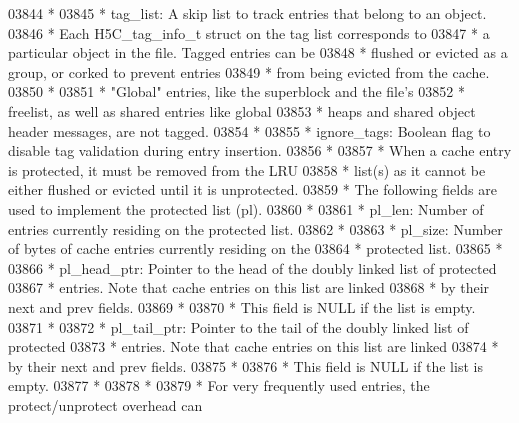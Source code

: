 \begin{DoxyCode}
03844 \textcolor{comment}{ *}
03845 \textcolor{comment}{ * tag\_list: A skip list to track entries that belong to an object.}
03846 \textcolor{comment}{ *                Each H5C\_tag\_info\_t struct on the tag list corresponds to}
03847 \textcolor{comment}{ *                a particular object in the file.  Tagged entries can be}
03848 \textcolor{comment}{ *                flushed or evicted as a group, or corked to prevent entries}
03849 \textcolor{comment}{ *                from being evicted from the cache.}
03850 \textcolor{comment}{ *}
03851 \textcolor{comment}{ *                "Global" entries, like the superblock and the file's}
03852 \textcolor{comment}{ *                freelist, as well as shared entries like global}
03853 \textcolor{comment}{ *                heaps and shared object header messages, are not tagged.}
03854 \textcolor{comment}{ *}
03855 \textcolor{comment}{ * ignore\_tags: Boolean flag to disable tag validation during entry insertion.}
03856 \textcolor{comment}{ *}
03857 \textcolor{comment}{ * When a cache entry is protected, it must be removed from the LRU}
03858 \textcolor{comment}{ * list(s) as it cannot be either flushed or evicted until it is unprotected.}
03859 \textcolor{comment}{ * The following fields are used to implement the protected list (pl).}
03860 \textcolor{comment}{ *}
03861 \textcolor{comment}{ * pl\_len:      Number of entries currently residing on the protected list.}
03862 \textcolor{comment}{ *}
03863 \textcolor{comment}{ * pl\_size:     Number of bytes of cache entries currently residing on the}
03864 \textcolor{comment}{ *              protected list.}
03865 \textcolor{comment}{ *}
03866 \textcolor{comment}{ * pl\_head\_ptr: Pointer to the head of the doubly linked list of protected}
03867 \textcolor{comment}{ *              entries.  Note that cache entries on this list are linked}
03868 \textcolor{comment}{ *              by their next and prev fields.}
03869 \textcolor{comment}{ *}
03870 \textcolor{comment}{ *              This field is NULL if the list is empty.}
03871 \textcolor{comment}{ *}
03872 \textcolor{comment}{ * pl\_tail\_ptr: Pointer to the tail of the doubly linked list of protected}
03873 \textcolor{comment}{ *              entries.  Note that cache entries on this list are linked}
03874 \textcolor{comment}{ *              by their next and prev fields.}
03875 \textcolor{comment}{ *}
03876 \textcolor{comment}{ *              This field is NULL if the list is empty.}
03877 \textcolor{comment}{ *}
03878 \textcolor{comment}{ *}
03879 \textcolor{comment}{ * For very frequently used entries, the protect/unprotect overhead can}

\end{DoxyCode}
